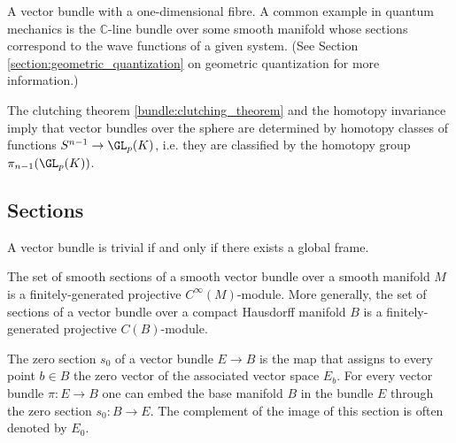     \begin{example}
        A vector bundle with a one-dimensional fibre. A common example in quantum mechanics is the $\mathbb{C}$-line bundle over some smooth manifold whose sections correspond to the wave functions of a given system. (See Section \ref{section:geometric_quantization} on geometric quantization for more information.)
    \end{example}

    \begin{property}\label{bundle:vector_bundles_over_sphere}
        The clutching theorem \ref{bundle:clutching_theorem} and the homotopy invariance imply that vector bundles over the sphere are determined by homotopy classes of functions $S^{n-1}\rightarrow\GL_p(K)$, i.e. they are classified by the homotopy group $\pi_{n-1}(\GL_p(K))$.
    \end{property}

\subsection{Sections}

    \begin{property}\label{bundle:trivial_vector_bundle}
        A vector bundle is trivial if and only if there exists a global frame.
    \end{property}

    \begin{theorem}\label{bundle:serre_swan}
        The set of smooth sections of a smooth vector bundle over a smooth manifold $M$ is a finitely-generated projective $C^\infty(M)$-module. More generally, the set of sections of a vector bundle over a compact Hausdorff manifold $B$ is a finitely-generated projective $C(B)$-module.
    \end{theorem}

    \begin{property}\label{bundle:zero_section}
        The zero section $s_0$ of a vector bundle $E\rightarrow B$ is the map that assigns to every point $b\in B$ the zero vector of the associated vector space $E_b$. For every vector bundle $\pi:E\rightarrow B$ one can embed the base manifold $B$ in the bundle $E$ through the zero section $s_0:B\rightarrow E$. The complement of the image of this section is often denoted by $E_0$.
    \end{property}


